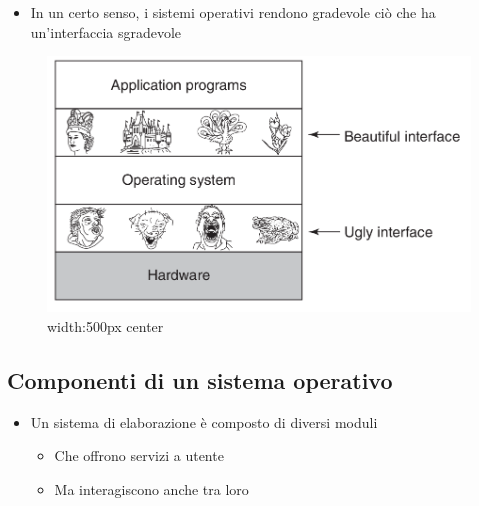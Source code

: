 \documentclass[]{article}
\providecommand{\tightlist}{%
  \setlength{\itemsep}{0pt}\setlength{\parskip}{0pt}}
\begin{document}
\begin{itemize}
\tightlist
\item
  In un certo senso, i sistemi operativi rendono gradevole ciò che ha
  un'interfaccia sgradevole
\end{itemize}

\begin{figure}
\centering
\includegraphics{images/so-beauty.png}
\caption{width:500px center}
\end{figure}

\hypertarget{componenti-di-un-sistema-operativo}{%
\subsection{Componenti di un sistema
operativo}\label{componenti-di-un-sistema-operativo}}

\begin{itemize}
\tightlist
\item
  Un sistema di elaborazione è composto di diversi moduli

  \begin{itemize}
  \tightlist
  \item
    Che offrono servizi a utente
  \item
    Ma interagiscono anche tra loro
  \end{itemize}
\end{itemize}
\end{document}

